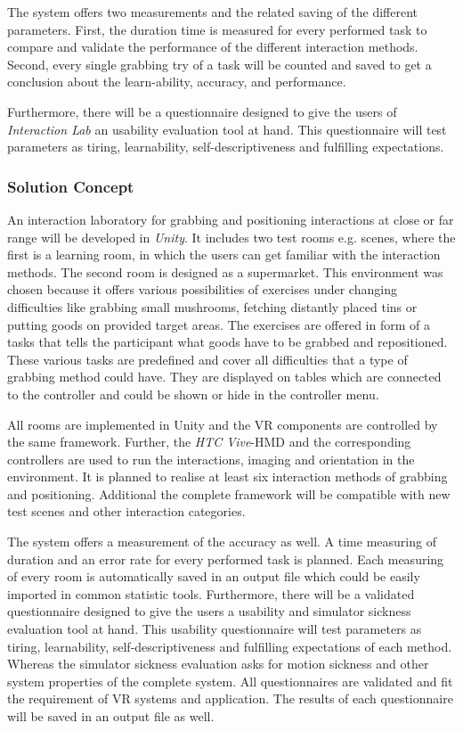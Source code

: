 The system offers two measurements and the related saving of the different parameters. First, the duration time is measured for every performed task to compare and validate the performance of the different interaction methods. Second, every single grabbing try of a task will be counted and saved to get a conclusion about the learn-ability, accuracy, and performance.

Furthermore, there will be a questionnaire designed to give the users of \textit{Interaction Lab} an usability evaluation tool at hand. This questionnaire will test parameters as tiring, learnability, self-descriptiveness and fulfilling expectations.


\subsubsection{Solution Concept}\label{sec:Projectconcept}

An interaction laboratory for grabbing and positioning interactions at close or far range will be developed in \textit{Unity}. It includes two test rooms e.g. scenes, where the first is a learning room, in which the users can get familiar with the interaction methods. The second room is designed as a supermarket. This environment was chosen because it offers various possibilities of exercises under changing difficulties like grabbing small mushrooms, fetching distantly placed tins or putting goods on provided target areas. The exercises are offered in form of a tasks that tells the participant what goods have to be grabbed and repositioned. These various tasks are predefined and cover all difficulties that a type of grabbing method could have. They are displayed on tables which are connected to the controller and could be shown or hide in the controller menu. 

All rooms are implemented in Unity and the VR components are controlled by the same framework. Further, the \textit{HTC Vive}-HMD and the corresponding controllers are used to run the interactions, imaging and orientation in the environment. It is planned to realise at least six interaction methods of grabbing and positioning. Additional the complete framework will be compatible with new test scenes and other interaction categories. 

The system offers a measurement of the accuracy as well. A time measuring of duration and an error rate for every performed task is planned. Each measuring of every room is automatically saved in an output file which could be easily imported in common statistic tools. Furthermore, there will be a validated questionnaire designed to give the users a usability and simulator sickness evaluation tool at hand. This usability questionnaire will test parameters as tiring, learnability, self-descriptiveness and fulfilling expectations of each method. Whereas the simulator sickness evaluation asks for motion sickness and other system properties of the complete system. All questionnaires are validated and fit the requirement of VR systems and application. The results of each questionnaire will be saved in an output file as well.

